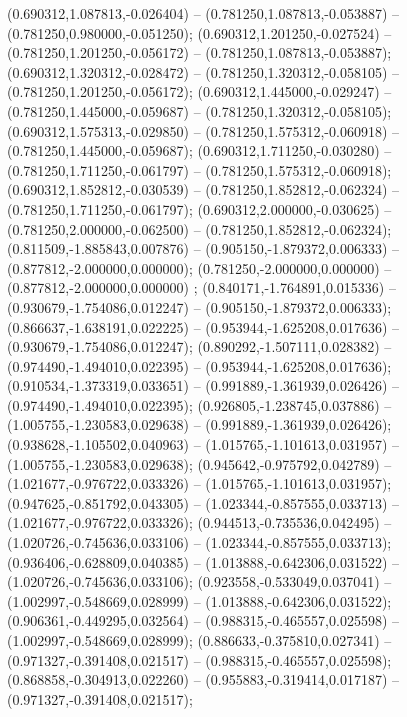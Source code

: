  (0.690312,1.087813,-0.026404) -- (0.781250,1.087813,-0.053887) -- (0.781250,0.980000,-0.051250);
 (0.690312,1.201250,-0.027524) -- (0.781250,1.201250,-0.056172) -- (0.781250,1.087813,-0.053887);
 (0.690312,1.320312,-0.028472) -- (0.781250,1.320312,-0.058105) -- (0.781250,1.201250,-0.056172);
 (0.690312,1.445000,-0.029247) -- (0.781250,1.445000,-0.059687) -- (0.781250,1.320312,-0.058105);
 (0.690312,1.575313,-0.029850) -- (0.781250,1.575312,-0.060918) -- (0.781250,1.445000,-0.059687);
 (0.690312,1.711250,-0.030280) -- (0.781250,1.711250,-0.061797) -- (0.781250,1.575312,-0.060918);
 (0.690312,1.852812,-0.030539) -- (0.781250,1.852812,-0.062324) -- (0.781250,1.711250,-0.061797);
 (0.690312,2.000000,-0.030625) -- (0.781250,2.000000,-0.062500) -- (0.781250,1.852812,-0.062324);
 (0.811509,-1.885843,0.007876) -- (0.905150,-1.879372,0.006333) -- (0.877812,-2.000000,0.000000);
 (0.781250,-2.000000,0.000000) -- (0.877812,-2.000000,0.000000) ;
 (0.840171,-1.764891,0.015336) -- (0.930679,-1.754086,0.012247) -- (0.905150,-1.879372,0.006333);
 (0.866637,-1.638191,0.022225) -- (0.953944,-1.625208,0.017636) -- (0.930679,-1.754086,0.012247);
 (0.890292,-1.507111,0.028382) -- (0.974490,-1.494010,0.022395) -- (0.953944,-1.625208,0.017636);
 (0.910534,-1.373319,0.033651) -- (0.991889,-1.361939,0.026426) -- (0.974490,-1.494010,0.022395);
 (0.926805,-1.238745,0.037886) -- (1.005755,-1.230583,0.029638) -- (0.991889,-1.361939,0.026426);
 (0.938628,-1.105502,0.040963) -- (1.015765,-1.101613,0.031957) -- (1.005755,-1.230583,0.029638);
 (0.945642,-0.975792,0.042789) -- (1.021677,-0.976722,0.033326) -- (1.015765,-1.101613,0.031957);
 (0.947625,-0.851792,0.043305) -- (1.023344,-0.857555,0.033713) -- (1.021677,-0.976722,0.033326);
 (0.944513,-0.735536,0.042495) -- (1.020726,-0.745636,0.033106) -- (1.023344,-0.857555,0.033713);
 (0.936406,-0.628809,0.040385) -- (1.013888,-0.642306,0.031522) -- (1.020726,-0.745636,0.033106);
 (0.923558,-0.533049,0.037041) -- (1.002997,-0.548669,0.028999) -- (1.013888,-0.642306,0.031522);
 (0.906361,-0.449295,0.032564) -- (0.988315,-0.465557,0.025598) -- (1.002997,-0.548669,0.028999);
 (0.886633,-0.375810,0.027341) -- (0.971327,-0.391408,0.021517) -- (0.988315,-0.465557,0.025598);
 (0.868858,-0.304913,0.022260) -- (0.955883,-0.319414,0.017187) -- (0.971327,-0.391408,0.021517);
